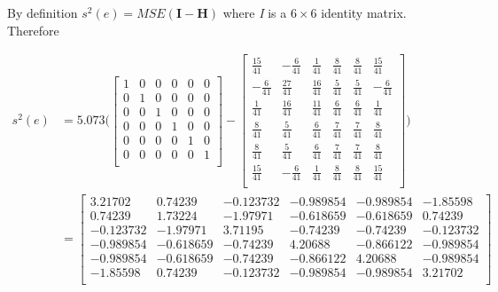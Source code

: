 \documentclass[12pt, letterpaper]{article}
\begin{document}
By definition $s^{2}(e) = MSE(\textbf{I} - \textbf{H})$ where \textit{I} is a $6\times6$ identity matrix. Therefore

\begin{align*}
s^{2}(e) &= 5.073\Bigg(\begin{bmatrix}
 1 & 0 & 0 & 0 & 0 & 0 \\
 0 & 1 & 0 & 0 & 0 & 0 \\
 0 & 0 & 1 & 0 & 0 & 0 \\
 0 & 0 & 0 & 1 & 0 & 0 \\
 0 & 0 & 0 & 0 & 1 & 0 \\
 0 & 0 & 0 & 0 & 0 & 1 \\
\end{bmatrix} - \begin{bmatrix}
 \frac{15}{41} & -\frac{6}{41} & \frac{1}{41} & \frac{8}{41} & \frac{8}{41} & \frac{15}{41} \\
 -\frac{6}{41} & \frac{27}{41} & \frac{16}{41} & \frac{5}{41} & \frac{5}{41} & -\frac{6}{41} \\
 \frac{1}{41} & \frac{16}{41} & \frac{11}{41} & \frac{6}{41} & \frac{6}{41} & \frac{1}{41} \\
 \frac{8}{41} & \frac{5}{41} & \frac{6}{41} & \frac{7}{41} & \frac{7}{41} & \frac{8}{41} \\
 \frac{8}{41} & \frac{5}{41} & \frac{6}{41} & \frac{7}{41} & \frac{7}{41} & \frac{8}{41} \\
 \frac{15}{41} & -\frac{6}{41} & \frac{1}{41} & \frac{8}{41} & \frac{8}{41} & \frac{15}{41} \\
\end{bmatrix}\Bigg) \\
&= \begin{bmatrix}
3.21702 & 0.74239 & -0.123732 & -0.989854 & -0.989854 & -1.85598 \\
 0.74239 & 1.73224 & -1.97971 & -0.618659 & -0.618659 & 0.74239 \\
 -0.123732 & -1.97971 & 3.71195 & -0.74239 & -0.74239 & -0.123732 \\
 -0.989854 & -0.618659 & -0.74239 & 4.20688 & -0.866122 & -0.989854 \\
 -0.989854 & -0.618659 & -0.74239 & -0.866122 & 4.20688 & -0.989854 \\
 -1.85598 & 0.74239 & -0.123732 & -0.989854 & -0.989854 & 3.21702 \\
\end{bmatrix}
\end{align*}
\end{document}
